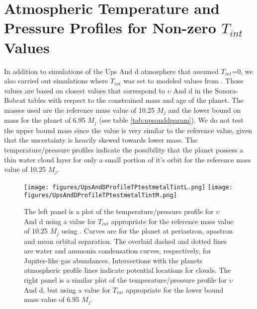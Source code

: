 \documentclass[12pt, letterpaper]{aastex631}
\begin{document}
%
\newpage
\appendix

\section{Atmospheric Temperature and Pressure Profiles for Non-zero $T_{int}$ Values} \label{sec:TPTint}

In addition to simulations of the Ups And d atmosphere that assumed $T_{int}$=0, we also carried out simulations where $T_{int}$ was set to modeled values from \citep{marley_mark_2018_1309035}.  Those values are based on closest values that correspond to $\upsilon$ And d in the Sonora-Bobcat tables \citep{marley_mark_2018_1309035} with respect to the constrained mass and age of the planet.  The masses used are the reference mass value of 10.25 $M_{j}$ and the lower bound on mass for the planet of 6.95 $M_{j}$ (see table \ref{tab:upsanddparam}).  We do not test the upper bound mass since the value is very similar to the reference value, given that the uncertainty is heavily skewed towards lower mass.  The temperature/pressure profiles indicate the possibility that the planet possess a thin water cloud layer for only a small portion of it's orbit for the reference mass value of 10.25 $M_{j}$.

\begin{figure*}[h!]
  \centering
  {\texttt{[image: figures/UpsAndDProfileTPtestmetalTintL.png]}}
  \texttt{[image: figures/UpsAndDProfileTPtestmetalTintM.png]}
  \caption{The left panel is a plot of the temperature/pressure profile for $\upsilon$ And d using a value for $T_{int}$ appropriate for the reference mass value of 10.25 $M_{j}$ using \textcite{marley_mark_2018_1309035}. Curves are for the planet at periastron, apastron and mean orbital separation.  The overlaid dashed and dotted lines are water and ammonia condensation curves, respectively, for Jupiter-like gas abundances.  Intersections with the planets atmospheric profile lines indicate potential locations for clouds. The right panel is a similar plot of the temperature/pressure profile for $\upsilon$ And d, but using a value for $T_{int}$ appropriate for the lower bound mass value of 6.95 $M_{j}$.}
  \label{fig:TPTint}
\end{figure*}
\end{document}
